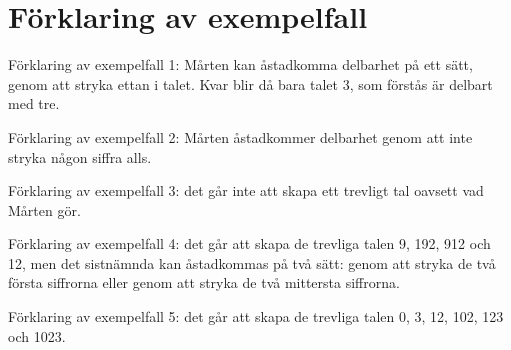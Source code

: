 \section*{Förklaring av exempelfall}
Förklaring av exempelfall 1: Mårten kan åstadkomma delbarhet på ett sätt, genom att stryka ettan i talet. Kvar blir då bara talet 3, som förstås är delbart med tre.

Förklaring av exempelfall 2: Mårten åstadkommer delbarhet genom att inte stryka någon siffra alls.

Förklaring av exempelfall 3: det går inte att skapa ett trevligt tal oavsett vad Mårten gör.

Förklaring av exempelfall 4: det går att skapa de trevliga talen 9, 192, 912 och 12, men det sistnämnda kan åstadkommas på två sätt: genom att stryka de två första siffrorna eller genom att stryka de två mittersta siffrorna.

Förklaring av exempelfall 5: det går att skapa de trevliga talen 0, 3, 12, 102, 123 och 1023.